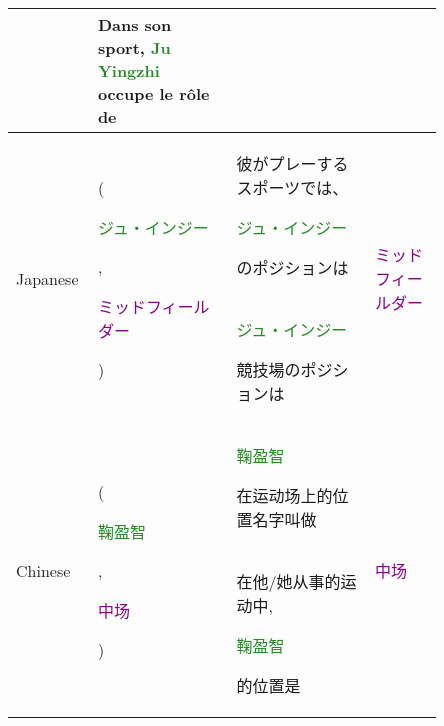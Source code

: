 \begin{table*}[htbp]
\begin{center}
\begin{tabular}{m{0.10\linewidth} p{0.30\linewidth} p{0.30\linewidth} m{0.15\linewidth}}
    & Dans son sport, \textcolor{forestgreen}{Ju Yingzhi} occupe le rôle de
    & \\
\midrule
\multirow{2}{*}{\centering Japanese}
    & \multirow{2}{*}{\raggedright (\textcolor{forestgreen}{\begin{CJK}{UTF8}{min}ジュ・インジー\end{CJK}}, \textcolor{darkmagenta}{\begin{CJK}{UTF8}{min}ミッドフィールダー\end{CJK}})}
    & \begin{CJK}{UTF8}{min}彼がプレーするスポーツでは、\end{CJK}\textcolor{forestgreen}{\begin{CJK}{UTF8}{min}ジュ・インジー\end{CJK}}\begin{CJK}{UTF8}{min}のポジションは\end{CJK}
    & \multirow{2}{*}{\centering \textcolor{darkmagenta}{\begin{CJK}{UTF8}{min}ミッドフィールダー\end{CJK}}} \\
    & 
    & \textcolor{forestgreen}{\begin{CJK}{UTF8}{min}ジュ・インジー\end{CJK}}\begin{CJK}{UTF8}{min}競技場のポジションは\end{CJK}
    & \\
\midrule
\multirow{2}{*}{\centering Chinese}
    & \multirow{2}{*}{\raggedright (\textcolor{forestgreen}{\begin{CJK}{UTF8}{gbsn}鞠盈智\end{CJK}}, \textcolor{darkmagenta}{\begin{CJK}{UTF8}{gbsn}中场\end{CJK}})}
    & \textcolor{forestgreen}{\begin{CJK}{UTF8}{gbsn}鞠盈智\end{CJK}}\begin{CJK}{UTF8}{gbsn}在运动场上的位置名字叫做\end{CJK}
    & \multirow{2}{*}{\centering \textcolor{darkmagenta}{\begin{CJK}{UTF8}{gbsn}中场\end{CJK}}} \\
    & 
    & \begin{CJK}{UTF8}{gbsn}在他/她从事的运动中,\end{CJK}\textcolor{forestgreen}{\begin{CJK}{UTF8}{gbsn}鞠盈智\end{CJK}}\begin{CJK}{UTF8}{gbsn}的位置是\end{CJK}

\end{tabular}
\end{center}
\end{table*}
